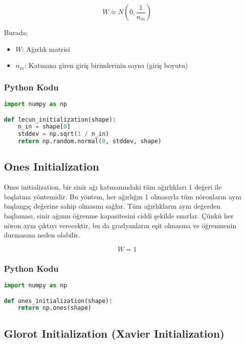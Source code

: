 \[ W \approx N (0, \frac{1}{n_{in}}) \]

Burada;

\begin{itemize}
    \item $W$: Ağırlık matrisi
    \item $n_{in}$: Katmana giren giriş birimlerinin sayısı (giriş boyutu)
\end{itemize}

\subsubsection{Python Kodu}

\begin{lstlisting}[language=Python]
import numpy as np

def lecun_initialization(shape):
    n_in = shape[0]
    stddev = np.sqrt(1 / n_in)
    return np.random.normal(0, stddev, shape)
\end{lstlisting}

\newpage

\subsection{Ones Initialization}

Ones initialization, bir sinir ağı katmanındaki tüm ağırlıkları 1 değeri ile başlatma yöntemidir. Bu yöntem, her ağırlığın 1 olmasıyla tüm nöronların aynı başlangıç değerine sahip olmasını sağlar.  Tüm ağırlıkların aynı değerden başlaması, sinir ağının öğrenme kapasitesini ciddi şekilde sınırlar. Çünkü her nöron aynı çıktıyı verecektir, bu da gradyanların eşit olmasına ve öğrenmenin durmasına neden olabilir.

\[ W = 1 \]

\subsubsection{Python Kodu}

\begin{lstlisting}[language=Python]
import numpy as np

def ones_initialization(shape):
    return np.ones(shape)
\end{lstlisting}

\newpage

\subsection{Glorot Initialization (Xavier Initialization)}

